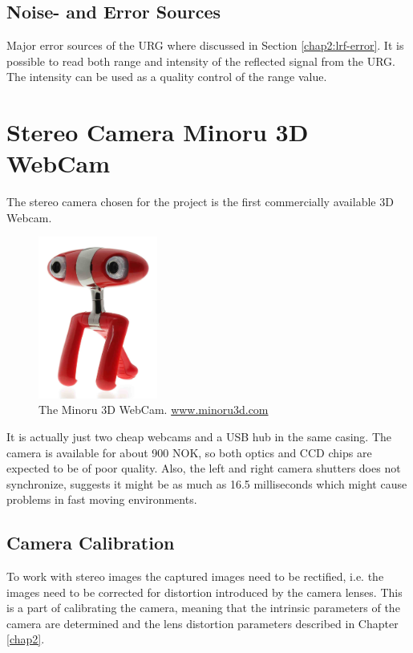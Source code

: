 \subsection{Noise- and Error Sources}
Major error sources of the URG where discussed in Section \ref{chap2:lrf-error}. It is
possible to read both range and intensity of the reflected signal from the URG. The
intensity can be used as a quality control of the range value. 





\section{Stereo Camera Minoru 3D WebCam}
The stereo camera chosen for the project is the first commercially available 3D Webcam.
\begin{figure}[htbp]
    \centering
    \includegraphics[width=0.35\textwidth]{pics/minoru3d}
    \caption{The Minoru 3D WebCam. \url{www.minoru3d.com}}
    \label{chap3:fig-minoru}
\end{figure}
It is actually just two cheap webcams and a USB hub in the same casing. The camera is
available for about 900 NOK, so both optics and CCD chips are expected to be of poor
quality. Also, the left and right camera shutters does not synchronize, \cite{nma-web}
suggests it might be as much as 16.5 milliseconds which might cause problems in fast
moving environments. 


\subsection{Camera Calibration}
To work with stereo images the captured images need to be rectified, i.e. the images need
to be corrected for distortion introduced by the camera lenses. This is a part of
calibrating the camera, meaning that the intrinsic parameters of the camera are
determined and the lens distortion parameters described in Chapter \ref{chap2}.


